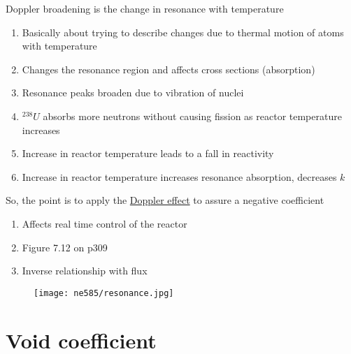 \documentclass[aspectratio=1610,pdftex,dvipsnames,compress,xcolor={dvipsnames}]{beamer}
\begin{document}
\addtocounter{framenumber}{-1} 
\begin{frame}{Doppler broadening is the change in resonance with temperature}
    \begin{enumerate}[series=outerlist,topsep=0pt,itemsep=21pt,leftmargin=*,label=(\arabic*)]
        \item[]Basically about trying to describe changes due to thermal motion of atoms with temperature
        \item[]Changes the resonance region and affects cross sections (absorption)
        \item[]Resonance peaks broaden due to vibration of nuclei
        \item[]$^{238}U$ absorbs more neutrons without causing fission as reactor temperature increases
        \item[]Increase in reactor temperature leads to a fall in reactivity
        \item[]Increase in reactor temperature increases resonance absorption, decreases $k$
    \end{enumerate}
\end{frame}


\begin{frame}{So, the point is to apply the \href{https://uidaho.pressbooks.pub/nuclearengineering/chapter/nuclear-reactor-kinetics-2/}{Doppler effect} to assure a negative coefficient}
    \begin{enumerate}[series=outerlist,topsep=0pt,itemsep=21pt,leftmargin=*,label=(\arabic*)]
        \item[]Affects real time control of the reactor
        \item[]Figure 7.12 on p309
        \item[]Inverse relationship with flux
    \end{enumerate}
\end{frame}


\begin{frame}{}
    \begin{figure}
        \centering
        \texttt{[image: ne585/resonance.jpg]}
    \end{figure}
\end{frame}


\section{Void coefficient}
\end{document}
